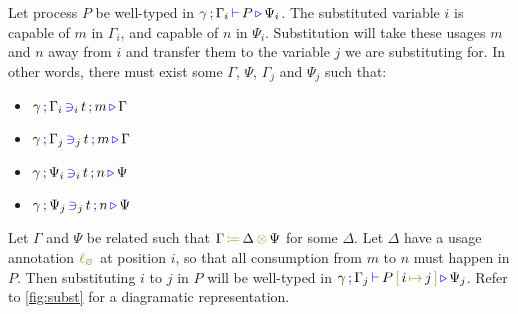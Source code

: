 \begin{nitheorem}
  \label{thm:subst-generalization1}
  Let process $P$ be well-typed in $\types{\gamma}{\Gamma_i}{P}{\Psi_i}$.
  The substituted variable $i$ is capable of $m$ in $\Gamma_i$, and capable of $n$ in $\Psi_i$.
  Substitution will take these usages $m$ and $n$ away from $i$ and transfer them to the variable $j$ we are substituting for.
  In other words, there must exist some $\Gamma$, $\Psi$, $\Gamma_j$ and $\Psi_j$ such that:
  \begin{multicols}{2}
  \begin{itemize}
    \item $\contains{\gamma}{\Gamma_i}{i}{t}{m}{\Gamma}$
    \item $\contains{\gamma}{\Gamma_j}{j}{t}{m}{\Gamma}$
    \item $\contains{\gamma}{\Psi_i}{i}{t}{n}{\Psi}$
    \item $\contains{\gamma}{\Psi_j}{j}{t}{n}{\Psi}$
  \end{itemize}
  \end{multicols}
  Let $\Gamma$ and $\Psi$ be related such that $\opctx{\Gamma}{\Delta}{\Psi}$ for some $\Delta$.
  Let $\Delta$ have a usage annotation $\lz$ at position $i$, so that all consumption from $m$ to $n$ must happen in $P$.
  Then substituting $i$ to $j$ in $P$ will be well-typed in $\types{\gamma}{\Gamma_j}{\subst{P}{j}{i}}{\Psi_j}$.
  Refer to \autoref{fig:subst} for a diagramatic representation.
\end{nitheorem}

